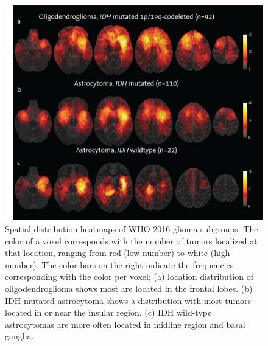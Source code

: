 \begin{figure}
    \centering
    \includegraphics[width=\textwidth]{Figures/Figure_1.png}
    \caption{Spatial distribution heatmaps of WHO 2016 glioma subgroups. The color of a voxel corresponds with the number of \glspl{tumor} localized at that
    location, ranging from red (low number) to white (high number). The color bars on the right indicate the frequencies corresponding with the color
    per voxel; (a) location distribution of oligodendroglioma shows most are located in the frontal lobes. (b) IDH-mutated astrocytoma shows a distribution with most \glspl{tumor} located in or near the insular region. (c) IDH wild-type astrocytomas are more often located in midline region and basal
    ganglia.}
    \label{fig:LGG_location_heatmap_subgroups}
    \end{figure}


